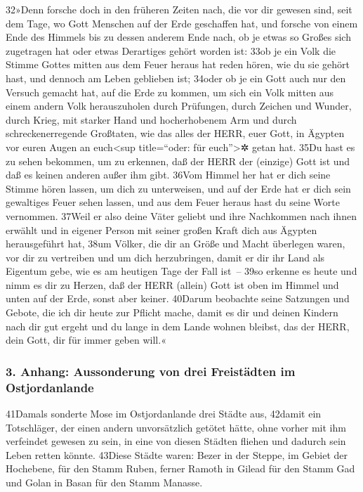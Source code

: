 32»Denn forsche doch in den früheren Zeiten nach, die vor dir gewesen
sind, seit dem Tage, wo Gott Menschen auf der Erde geschaffen hat, und
forsche von einem Ende des Himmels bis zu dessen anderem Ende nach, ob
je etwas so Großes sich zugetragen hat oder etwas Derartiges gehört
worden ist: 33ob je ein Volk die Stimme Gottes mitten aus dem Feuer
heraus hat reden hören, wie du sie gehört hast, und dennoch am Leben
geblieben ist; 34oder ob je ein Gott auch nur den Versuch gemacht hat,
auf die Erde zu kommen, um sich ein Volk mitten aus einem andern Volk
herauszuholen durch Prüfungen, durch Zeichen und Wunder, durch Krieg,
mit starker Hand und hocherhobenem Arm und durch schreckenerregende
Großtaten, wie das alles der HERR, euer Gott, in Ägypten vor euren Augen
an euch\textless sup title=``oder: für euch''\textgreater✲ getan hat.
35Du hast es zu sehen bekommen, um zu erkennen, daß der HERR der
(einzige) Gott ist und daß es keinen anderen außer ihm gibt. 36Vom
Himmel her hat er dich seine Stimme hören lassen, um dich zu
unterweisen, und auf der Erde hat er dich sein gewaltiges Feuer sehen
lassen, und aus dem Feuer heraus hast du seine Worte vernommen. 37Weil
er also deine Väter geliebt und ihre Nachkommen nach ihnen erwählt und
in eigener Person mit seiner großen Kraft dich aus Ägypten herausgeführt
hat, 38um Völker, die dir an Größe und Macht überlegen waren, vor dir zu
vertreiben und um dich herzubringen, damit er dir ihr Land als Eigentum
gebe, wie es am heutigen Tage der Fall ist~-- 39so erkenne es heute und
nimm es dir zu Herzen, daß der HERR (allein) Gott ist oben im Himmel und
unten auf der Erde, sonst aber keiner. 40Darum beobachte seine Satzungen
und Gebote, die ich dir heute zur Pflicht mache, damit es dir und deinen
Kindern nach dir gut ergeht und du lange in dem Lande wohnen bleibst,
das der HERR, dein Gott, dir für immer geben will.«

\hypertarget{anhang-aussonderung-von-drei-freistuxe4dten-im-ostjordanlande}{%
\subsubsection{3. Anhang: Aussonderung von drei Freistädten im
Ostjordanlande}\label{anhang-aussonderung-von-drei-freistuxe4dten-im-ostjordanlande}}

41Damals sonderte Mose im Ostjordanlande drei Städte aus, 42damit ein
Totschläger, der einen andern unvorsätzlich getötet hätte, ohne vorher
mit ihm verfeindet gewesen zu sein, in eine von diesen Städten fliehen
und dadurch sein Leben retten könnte. 43Diese Städte waren: Bezer in der
Steppe, im Gebiet der Hochebene, für den Stamm Ruben, ferner Ramoth in
Gilead für den Stamm Gad und Golan in Basan für den Stamm Manasse.

